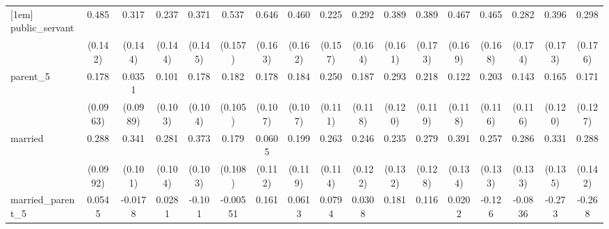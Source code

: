 {\begin{tabular}{l*{16}{c}}
[1em]
public\_servant      &       0.485\sym{***}&       0.317\sym{*}  &       0.237         &       0.371\sym{*}  &       0.537\sym{***}&       0.646\sym{***}&       0.460\sym{**} &       0.225         &       0.292         &       0.389\sym{*}  &       0.389\sym{*}  &       0.467\sym{**} &       0.465\sym{**} &       0.282         &       0.396\sym{*}  &       0.298         \\
                    &     (0.142)         &     (0.144)         &     (0.144)         &     (0.145)         &     (0.157)         &     (0.163)         &     (0.162)         &     (0.157)         &     (0.164)         &     (0.161)         &     (0.173)         &     (0.169)         &     (0.168)         &     (0.174)         &     (0.173)         &     (0.176)         \\
[1em]
parent\_5            &       0.178         &      0.0351         &       0.101         &       0.178         &       0.182         &       0.178         &       0.184         &       0.250\sym{*}  &       0.187         &       0.293\sym{*}  &       0.218         &       0.122         &       0.203         &       0.143         &       0.165         &       0.171         \\
                    &    (0.0963)         &    (0.0989)         &     (0.103)         &     (0.104)         &     (0.105)         &     (0.107)         &     (0.107)         &     (0.111)         &     (0.118)         &     (0.120)         &     (0.119)         &     (0.118)         &     (0.116)         &     (0.116)         &     (0.120)         &     (0.127)         \\
[1em]
married             &       0.288\sym{**} &       0.341\sym{***}&       0.281\sym{**} &       0.373\sym{***}&       0.179         &      0.0605         &       0.199         &       0.263\sym{*}  &       0.246\sym{*}  &       0.235         &       0.279\sym{*}  &       0.391\sym{**} &       0.257         &       0.286\sym{*}  &       0.331\sym{*}  &       0.288\sym{*}  \\
                    &    (0.0992)         &     (0.101)         &     (0.104)         &     (0.103)         &     (0.108)         &     (0.112)         &     (0.119)         &     (0.114)         &     (0.122)         &     (0.132)         &     (0.128)         &     (0.134)         &     (0.133)         &     (0.133)         &     (0.135)         &     (0.142)         \\
[1em]
married\_parent\_5    &      0.0545         &     -0.0178         &      0.0281         &      -0.101         &    -0.00551         &       0.161         &      0.0613         &      0.0794         &      0.0308         &       0.181         &       0.116         &      0.0202         &      -0.126         &     -0.0836         &      -0.273         &      -0.268         \\

\end{tabular}}
